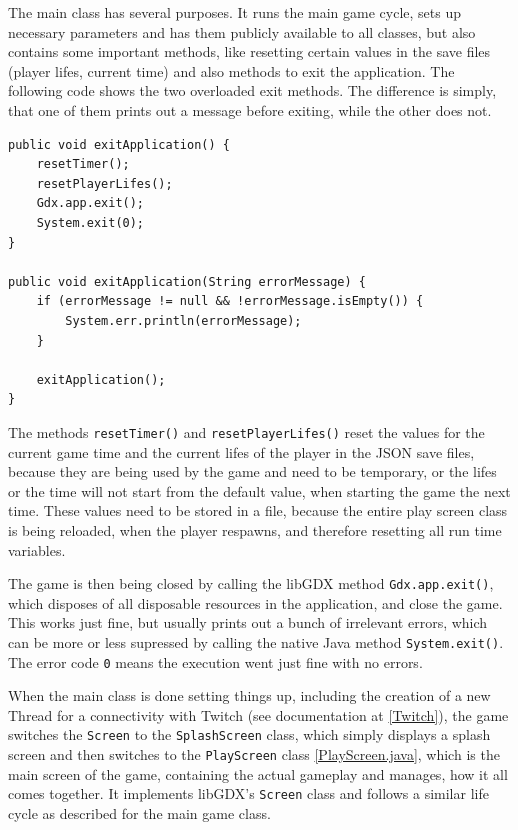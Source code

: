 \documentclass[12p]{article}
\begin{document}
The main class has several purposes. It runs the main game cycle, sets up necessary parameters and has them publicly available to all classes, but also contains some important methods, like resetting certain values in the save files (player lifes, current time) and also methods to exit the application. The following code shows the two overloaded exit methods. The difference is simply, that one of them prints out a message before exiting, while the other does not.

\begin{verbatim}
public void exitApplication() {
	resetTimer();
	resetPlayerLifes();
	Gdx.app.exit();
	System.exit(0);
}

public void exitApplication(String errorMessage) {
	if (errorMessage != null && !errorMessage.isEmpty()) {
		System.err.println(errorMessage);
	}

	exitApplication();
}
\end{verbatim}

The methods \texttt{resetTimer()} and \texttt{resetPlayerLifes()} reset the values for the current game time and the current lifes of the player in the JSON save files, because they are being used by the game and need to be temporary, or the lifes or the time will not start from the default value, when starting the game the next time. These values need to be stored in a file, because the entire play screen class is being reloaded, when the player respawns, and therefore resetting all run time variables.

The game is then being closed by calling the libGDX method \texttt{Gdx.app.exit()}, which disposes of all disposable resources in the application, and close the game. This works just fine, but usually prints out a bunch of irrelevant errors, which can be more or less supressed by calling the native Java method \texttt{System.exit()}. The error code \texttt{0} means the execution went just fine with no errors.

When the main class is done setting things up, including the creation of a new Thread for a connectivity with Twitch (see documentation at \ref{Twitch}), the game switches the \texttt{Screen} to the \texttt{SplashScreen} class, which simply displays a splash screen and then switches to the \texttt{PlayScreen} class \ref{PlayScreen.java}, which is the main screen of the game, containing the actual gameplay and manages, how it all comes together. It implements libGDX's \texttt{Screen} class and follows a similar life cycle as described for the main game class.
\end{document}
